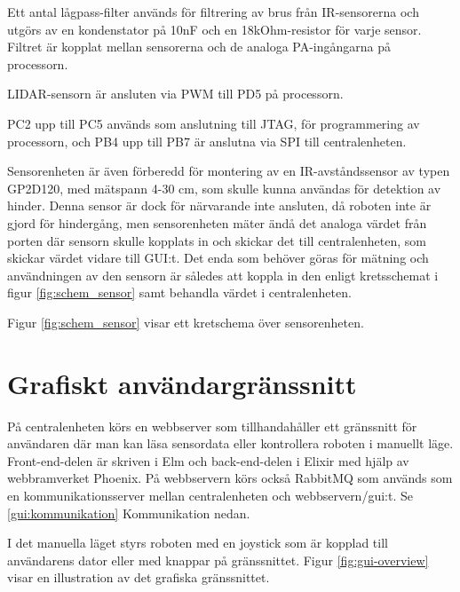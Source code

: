 \documentclass[a4paper,titlepage,12pt]{article}
\begin{document}
    Ett antal lågpass-filter används för filtrering av brus från IR-sensorerna
    och utgörs av en kondenstator på 10nF och en 18kOhm-resistor för varje
    sensor. Filtret är kopplat mellan sensorerna och de analoga PA-ingångarna på
    processorn.

    LIDAR-sensorn är ansluten via PWM till PD5 på processorn.

    PC2 upp till PC5 används som anslutning till JTAG, för programmering av
    processorn, och PB4 upp till PB7 är anslutna via SPI till centralenheten.

    Sensorenheten är även förberedd för montering av en IR-avståndssensor av
    typen GP2D120, med mätspann 4-30 cm, som skulle kunna användas för
    detektion av hinder. Denna sensor är dock för närvarande inte ansluten, då
    roboten inte är gjord för hindergång, men sensorenheten mäter ändå
    det analoga värdet från porten där sensorn skulle kopplats in och skickar
    det till centralenheten, som skickar värdet vidare till GUI:t.
    Det enda som behöver göras för mätning och
    användningen av den sensorn är således att koppla in den enligt
    kretsschemat i figur \ref{fig:schem_sensor} samt behandla värdet i
    centralenheten.

    Figur \ref{fig:schem_sensor} visar ett kretschema över sensorenheten.

	

    \newpage
	\section{Grafiskt användargränssnitt}
	På centralenheten körs en webbserver som tillhandahåller ett gränssnitt för
    användaren där man kan läsa sensordata eller kontrollera roboten i manuellt
    läge. Front-end-delen är skriven i Elm och back-end-delen i Elixir med hjälp
    av webbramverket Phoenix. På webbservern körs också RabbitMQ som används som
    en kommunikationsserver mellan centralenheten och webbservern/gui:t. Se
    \ref{gui:kommunikation} Kommunikation nedan.

	I det manuella läget styrs roboten med en joystick som är kopplad till
    användarens dator eller med knappar på gränssnittet. Figur
    \ref{fig:gui-overview} visar en illustration av det grafiska gränssnittet.
	
\end{document}
